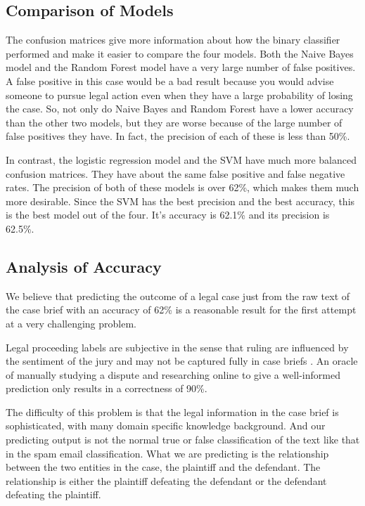 \documentclass[journal]{IEEEtran}
\begin{document}
\subsection{Comparison of Models}

The confusion matrices give more information about how the binary classifier performed and make it easier to compare the four models. Both the Naive Bayes model and the Random Forest model have a very large number of false positives. A false positive in this case would be a bad result because you would advise someone to pursue legal action even when they have a large probability of losing the case. So, not only do Naive Bayes and Random Forest have a lower accuracy than the other two models, but they are worse because of the large number of false positives they have. In fact, the precision of each of these is less than 50\%.

In contrast, the logistic regression model and the SVM have much more balanced confusion matrices. They have about the same false positive and false negative rates. The precision of both of these models is over 62\%, which makes them much more desirable. Since the SVM has the best precision and the best accuracy, this is the best model out of the four. It's accuracy is 62.1\% and its precision is 62.5\%. 

\subsection{Analysis of Accuracy}

We believe that predicting the outcome of a legal case just from the raw text of the case brief with an accuracy of 62\% is a reasonable result for the first attempt at a very challenging problem. 

Legal proceeding labels are subjective in the sense that ruling are influenced by the sentiment of the jury and may not be captured fully in case briefs \cite{ObjectiveAndSubjective}. An oracle of manually studying a dispute and researching online to give a well-informed prediction only results in a correctness of 90\%.

The difficulty of this problem is that the legal information in the case brief is sophisticated, with many domain specific knowledge background. And our predicting output is not the normal true or false classification of the text like that in the spam email classification. What we are predicting is the relationship between the two entities in the case, the plaintiff and the defendant. The relationship is either the plaintiff defeating the defendant or the defendant defeating the plaintiff.
\end{document}
